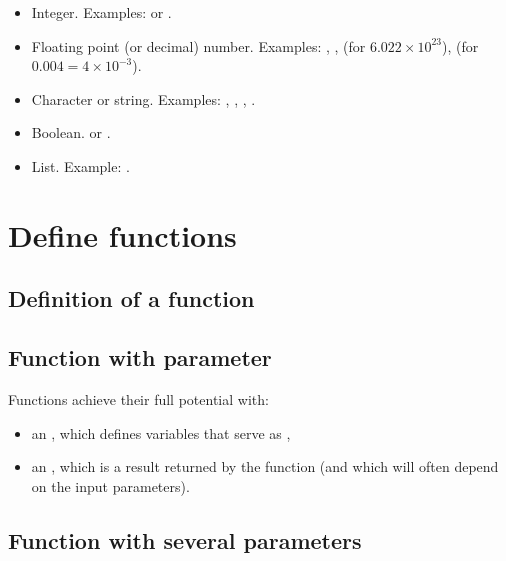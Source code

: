 \documentclass[11pt,class=report,crop=false]{standalone}
\begin{document}
\begin{itemize}
  \item {} \quad Integer. Examples:  or .
  \item {} \quad Floating point (or decimal) number. Examples: , ,  (for $6.022 \times 10^{23}$),  (for $0.004 = 4 \times 10^{-3}$).
  \item {} \quad Character or string. Examples: ,
  , , . 
  \item {} \quad Boolean.  or .
  \item {} \quad List. Example: \ci{[1,2,3,4]}.
\end{itemize}



\section{Define functions}

\subsection{Definition of a function}


\subsection{Function with parameter}

Functions achieve their full potential with:
\begin{itemize}
  \item an , which defines variables that serve as ,
  \item an , which is a result returned by the function (and which will often depend on the input parameters).
\end{itemize}




\subsection{Function with several parameters}
\end{document}
